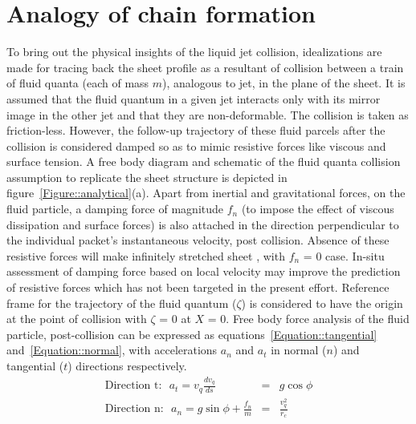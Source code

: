 \documentclass[%
 aip,
 sd,%
amsmath,amssymb,
preprint,%
author-year,%
]{revtex4-1}
\begin{document}
\section{Analogy of chain formation}	
To bring out the physical insights of the liquid jet collision, idealizations are made for tracing back the sheet profile as a resultant of collision between a train of fluid quanta (each of mass $m$), analogous to jet, in the plane of the sheet. It is assumed that the fluid quantum in a given jet interacts only with its mirror image in the other jet and that they are non-deformable. The collision is taken as friction-less. However, the follow-up trajectory of these fluid parcels after the collision is considered damped so as to mimic resistive forces like viscous and surface tension. A free body diagram and schematic of the fluid quanta collision assumption to replicate the sheet structure is depicted in figure~\ref{Figure::analytical}(a). Apart from inertial and gravitational forces, on the fluid particle, a damping force of magnitude $f_n$ (to impose the effect of viscous dissipation and surface forces) is also attached in the direction perpendicular to the individual packet's instantaneous velocity, post collision. Absence of these resistive forces will make infinitely stretched sheet \citep{taylor1960formation}, with $f_n$ = 0 case. {\color{red}In-situ assessment of damping force based on local velocity may improve the prediction of resistive forces which has not been targeted in the present effort.} Reference frame for the trajectory of the fluid quantum ($\zeta$) is considered to have the origin at the point of collision with $\zeta$ = 0 at $X$ = 0. Free body force analysis of the fluid particle, post-collision can be expressed as equations~\ref{Equation::tangential} and~\ref{Equation::normal}, with accelerations $a_n$ and $a_t$ in normal ($n$) and tangential ($t$) directions respectively.
\begin{subequations}%
	\label{Equation::forceBal}	
	\begin{eqnarray}
	\label{Equation::tangential}
	\text{Direction t:}\:\:\: a_t = v_{q}\frac{dv_{q}}{ds} &=& g\cos\phi\\
	\label{Equation::normal}
	\text{Direction n:}\:\:\: a_n = g\sin\phi + \frac{f_n}{m} &=& \frac{v_{q}^2}{r_c}
	\end{eqnarray}
\end{subequations}
\end{document}
